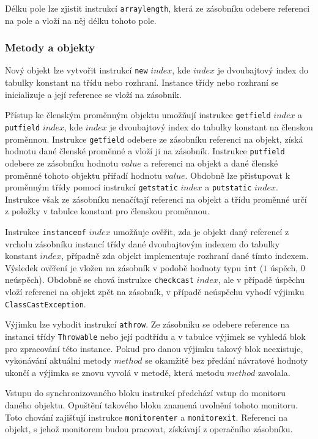 Délku pole lze zjistit instrukcí \texttt{arraylength}, která ze zásobníku odebere referenci na pole a vloží na něj délku tohoto pole.

\subsubsection{Metody a objekty}

Nový objekt lze vytvořit instrukcí \texttt{new} $index$, kde $index$ je dvoubajtový index do tabulky konstant na třídu nebo rozhraní. Instance třídy nebo rozhraní se inicializuje a její reference se vloží na zásobník.

Přístup ke členským proměnným objektu umožňují instrukce \texttt{getfield} $index$ a \texttt{putfield} $index$, kde $index$ je dvoubajtový index do tabulky konstant na členskou proměnnou. Instrukce \texttt{getfield} odebere ze zásobníku referenci na objekt, získá hodnotu dané členské proměnné a vloží ji na zásobník. Instrukce \texttt{putfield} odebere ze zásobníku hodnotu $value$ a referenci na objekt a dané členské proměnné tohoto objektu přiřadí hodnotu $value$. Obdobně lze přistupovat k proměnným třídy pomocí instrukcí \texttt{getstatic} $index$ a \texttt{putstatic} $index$. Instrukce však ze zásobníku nenačítají referenci na objekt a třídu proměnné určí z položky v tabulce konstant pro členskou proměnnou.



Instrukce \texttt{instanceof} $index$ umožňuje ověřit, zda je objekt daný referencí z vrcholu zásobníku instancí třídy dané dvoubajtovým indexem do tabulky konstant  $index$, případně zda objekt implementuje rozhraní dané tímto indexem. Výsledek ověření je vložen na zásobník v podobě hodnoty typu \texttt{int} ($1$ úspěch, $0$ neúspěch). Obdobně se chová instrukce \texttt{checkcast} $index$, ale v případě úspěchu vloží referenci na objekt zpět na zásobník, v případě neúspěchu vyhodí výjimku \texttt{ClassCastException}.


Výjimku lze vyhodit instrukcí \texttt{athrow}. Ze zásobníku se odebere reference na instanci třídy \texttt{Throwable} nebo její podtřídu a v tabulce výjimek se vyhledá blok pro zpracování této instance. Pokud pro danou výjimku takový blok neexistuje, vykonávání aktuální metody $method$ se okamžitě bez předání návratové hodnoty ukončí a výjimka se znovu vyvolá v metodě, která metodu $method$ zavolala. 


Vstupu do synchronizovaného bloku instrukcí předchází vstup do monitoru daného objektu. Opuštění takového bloku znamená uvolnění tohoto monitoru. Toto chování zajišťují instrukce \texttt{monitorenter} a \texttt{monitorexit}. Referenci na objekt, s jehož monitorem budou pracovat, získávají z operačního zásobníku.

